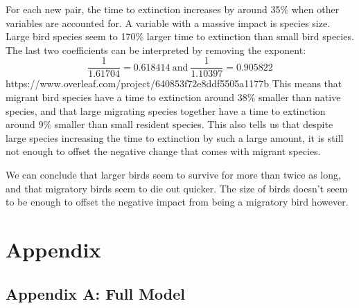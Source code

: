\documentclass[a4paper, 12pt]{article}
\begin{document}
\begin{spacing}{1.5}
For each new pair, the time to extinction increases by around 35\% when other variables are accounted for. A variable with a massive impact is species size. Large bird species seem to 170\% larger time to extinction than small bird species. The last two coefficients can be interpreted by removing the exponent:  
$$
\frac{1}{1.61704}=0.618414\ \text{and}\ \frac{1}{1.10397}=0.905822
$$https://www.overleaf.com/project/640853f72e8ddf5505a1177b
This means that migrant bird species have a time to extinction around 38\% smaller than native species, and that large migrating species together have a time to extinction around 9\% smaller than small resident species. This also tells us that despite large species increasing the time to extinction by such a large amount, it is still not enough to  offset the negative change that comes with migrant species.  

We can conclude that larger birds seem to survive for more than twice as long, and that migratory birds seem to die out quicker. The size of birds doesn't seem to be enough to offset the negative impact from being a migratory bird however.

\newpage
\section{Appendix}

\subsection{Appendix A: Full Model}


\end{spacing}
\end{document}
